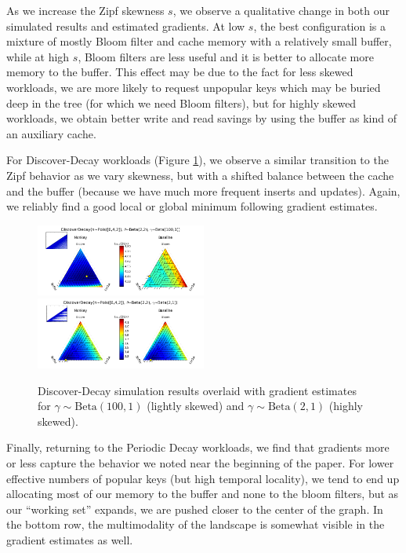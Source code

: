 \documentclass{sig-alternate-05-2015}
\begin{document}
As we increase the Zipf skewness $s$, we observe a qualitative change in both our simulated results and estimated gradients. At low $s$, the best configuration is a mixture of mostly Bloom filter and cache memory with a relatively small buffer, while at high $s$, Bloom filters are less useful and it is better to allocate more memory to the buffer. This effect may be due to the fact for less skewed workloads, we are more likely to request unpopular keys which may be buried deep in the tree (for which we need Bloom filters), but for highly skewed workloads, we obtain better write and read savings by using the buffer as kind of an auxiliary cache.

For Discover-Decay workloads (Figure \ref{fig:discdecquiv}), we observe a similar transition to the Zipf behavior as we vary skewness, but with a shifted balance between the cache and the buffer (because we have much more frequent inserts and updates). Again, we reliably find a good local or global minimum following gradient estimates.

\begin{figure}[!htb]
\begin{center}
\includegraphics[width=0.5\textwidth]{discdecquiv1.png}
\includegraphics[width=0.5\textwidth]{discdecquiv2.png}
\end{center}
\caption{Discover-Decay simulation results overlaid with gradient estimates for $\gamma\sim\text{Beta}(100,1)$ (lightly skewed) and $\gamma\sim\text{Beta}(2,1)$ (highly skewed).}
\label{fig:discdecquiv}
\end{figure}

Finally, returning to the Periodic Decay workloads, we find that gradients more or less capture the behavior we noted near the beginning of the paper. For lower effective numbers of popular keys (but high temporal locality), we tend to end up allocating most of our memory to the buffer and none to the bloom filters, but as our ``working set'' expands, we are pushed closer to the center of the graph. In the bottom row, the multimodality of the landscape is somewhat visible in the gradient estimates as well.
\end{document}
